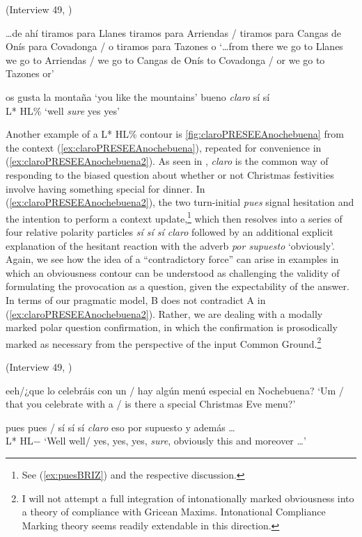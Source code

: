 \begin{exe}
	\ex \label{ex:claroPRESEEAmontana} (Interview 49, \cite{PRESEEA.20142020}) 
	\begin{xlist}[A:]
	 \ldots de ahí tiramos para Llanes tiramos para Arriendas / tiramos para Cangas de Onís para Covadonga / o tiramos para Tazones o 
	\glt `\ldots from there we go to Llanes we go to Arriendas / we go to Cangas de Onís to Covadonga / or we go to Tazones or'
	
	 os gusta la montaña 
	\glt `you like the mountains' 
	 bueno \textit{claro} sí sí \\
	\hspace*{3em}L* HL\% 
	\glt `well \textit{sure} yes yes' 
	\end{xlist}
\end{exe}

Another example of a L* HL\% contour is \autoref{fig:claroPRESEEAnochebuena} from the context (\ref{ex:claroPRESEEAnochebuena}), repeated for convenience in (\ref{ex:claroPRESEEAnochebuena2}). As seen in , \textit{claro} is the common way of responding to the biased question about whether or not Christmas festivities involve having something special for dinner. In (\ref{ex:claroPRESEEAnochebuena2}), the two turn-initial \textit{pues} signal hesitation and the intention to perform a context update,\footnote{See (\ref{ex:puesBRIZ}) and the respective discussion.} which then resolves into a series of four relative polarity particles \textit{sí sí sí claro} followed by an additional explicit explanation of the hesitant reaction with the adverb \textit{por supuesto} `obviously'. Again, we see how the idea of a ``contradictory force'' can arise in examples in which an obviousness contour can be understood as challenging the validity of formulating the provocation as a question, given the expectability of the answer. In terms of our pragmatic model, B does not contradict A in (\ref{ex:claroPRESEEAnochebuena2}). Rather, we are dealing with a modally marked polar question confirmation, in which the confirmation is prosodically marked as necessary from the perspective of the input Common Ground.\footnote{I will not attempt a full integration of intonationally marked obviousness into a theory of compliance with Gricean Maxims. Intonational Compliance Marking theory \citep{Westera.2017,Westera.2018} seems readily extendable in this direction.}

\begin{exe}
	\ex \label{ex:claroPRESEEAnochebuena2} (Interview 49, \cite{PRESEEA.20142020}) 
	\begin{xlist}[A:]
	  eeh/¿que lo celebráis con un / hay algún menú especial en Nochebuena? 
	\glt `Um / that you celebrate with a / is there a special Christmas Eve menu?'
	
	 pues pues / sí sí sí \textit{claro} eso por supuesto y además \ldots \\
	\hspace*{8em}L* HL$-$ 
	\glt`Well well/ yes, yes, yes, \textit{sure}, obviously this and moreover \ldots' 
	\end{xlist}
\end{exe}

